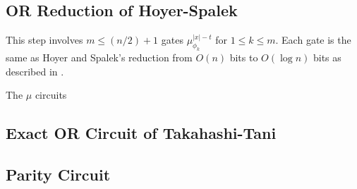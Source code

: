 \subsection{OR Reduction of Hoyer-Spalek}
\label{subsec:or-reduce}

This step involves $m \le (n/2)+1$ gates $\mu^{|x|-t}_{\phi_k}$ for
$1 \le k \le m$. Each gate is the same as Hoyer and Spalek's reduction from
$O(n)$ bits to $O(\log n)$ bits as described in \cite{Hoyer2002}.

The $\mu$ circuits 

\subsection{Exact OR Circuit of Takahashi-Tani}
\label{subsec:or-exact}



\subsection{Parity Circuit}
\label{subsec:parity}

